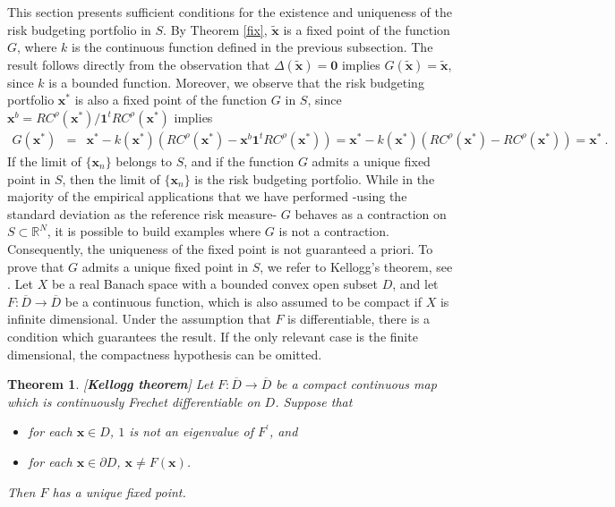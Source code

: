 \documentclass[preprint,11pt,authoryear]{elsarticle}
\newtheorem{theorem}{Theorem}%
\begin{document}
This section presents sufficient conditions for the existence and uniqueness of the risk budgeting portfolio in $S$.
By Theorem \ref{fix}, $\widetilde{ \mathbf{x}}$ is a fixed point of the function $G$, where $k$ is the continuous function defined in the previous subsection. The result follows directly from the observation that $\Delta (\widetilde{ \mathbf{x}} ) = \mathbf{0}$ implies $G(\widetilde{ \mathbf{x}} )=\widetilde{ \mathbf{x}} $, since $k$ is a bounded function.
Moreover, we observe that the risk budgeting portfolio $\mathbf{x}^*$ is also a fixed point of the function $G$ in $S$, since $ \mathbf{x}^b = RC^\rho(\mathbf{x}^*)/\boldsymbol{1}^t RC^\rho(\mathbf{x}^*)$ implies
\begin{eqnarray}\label{fixed_risk}
 G(\mathbf x^*)&=& \mathbf x^* - k(\mathbf x^*)\left (RC^\rho(\mathbf{x}^*) - \mathbf x^b \mathbf 1^t  RC^\rho(\mathbf{x}^*)\right ) =   \mathbf x^* -  k(\mathbf x^*)\left (RC^\rho(\mathbf{x}^*) - RC^\rho(\mathbf{x}^*) \right )= \mathbf  x^* \ . \nonumber
 \end{eqnarray}
If the limit of $\{\mathbf{x}_n\}$ belongs to $S$, and if the function $G$ admits a unique fixed point in $S$, then the limit of $\{\mathbf x_n\}$ is the risk budgeting portfolio. While in the majority of the empirical applications that we have performed -using the standard deviation as the reference risk measure- $G$ behaves as a contraction on $S \subset \mathbb R^N$, it is possible to build examples where $G$ is not a contraction. Consequently, the uniqueness of the fixed point is not guaranteed a priori. To prove that $G$ admits a unique fixed point in $S$, we refer to Kellogg's theorem, see \cite{kellogg1976uniqueness}. Let $X$ be a real Banach space with a bounded convex open subset $D$, and let $F: \overline D \rightarrow \overline D$ be a continuous function, which is also assumed to be compact if $X$ is infinite dimensional. Under the assumption that $F$ is differentiable, there is a condition which guarantees the result. If the only relevant case is the finite dimensional, the compactness hypothesis can be omitted.

\begin{theorem}\label{kellogg} [\textbf{Kellogg theorem}] 
 Let  $F: \overline D \rightarrow \overline D$ be a compact continuous map which is continuously Frechet differentiable on $D$. Suppose that 
 \begin{itemize}
 \item for each $\mathbf{x} \in D$, $1$ is not an eigenvalue of $F^\prime$, and 
 \item for each $\mathbf{x} \in \partial D$, $\mathbf{x} \neq F(\mathbf{x})$. 
 \end{itemize}
 Then $F$ has a unique fixed point.
 \end{theorem} 
\end{document}
